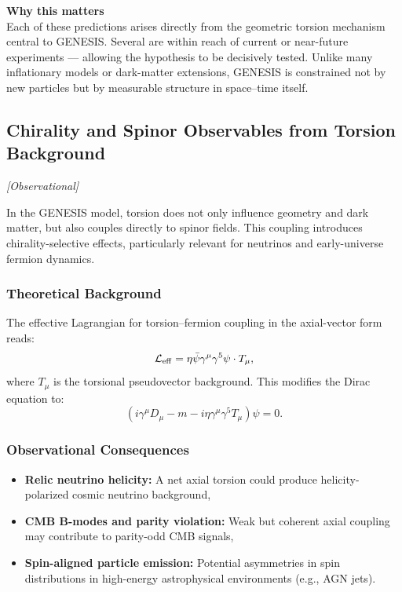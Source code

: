 \documentclass{article}
\newcommand{\obstag}{\textcolor{green!60!black}{\textit{[Observational]}}}
\begin{document}
\begin{tcolorbox}[
  colback=white,
  colframe=black!30,
  boxrule=0.3pt,
  arc=2pt,
  left=6pt,
  right=6pt,
  top=4pt,
  bottom=4pt,
  enhanced
]
\textbf{Why this matters} \\
\vspace{2pt}
Each of these predictions arises directly from the geometric torsion mechanism central to GENESIS.
Several are within reach of current or near-future experiments — allowing the hypothesis to be
decisively tested. Unlike many inflationary models or dark-matter extensions, GENESIS is
constrained not by new particles but by measurable structure in space–time itself.
\end{tcolorbox}




\subsection{ Chirality and Spinor Observables from Torsion Background}
\label{sec:spinor_observables}
\obstag


In the GENESIS model, torsion does not only influence geometry and dark matter, but also couples directly to spinor fields. This coupling introduces chirality-selective effects, particularly relevant for neutrinos and early-universe fermion dynamics.

\subsubsection*{Theoretical Background}
The effective Lagrangian for torsion–fermion coupling in the axial-vector form reads:
\begin{equation}
\mathcal{L}_{\rm eff} = \eta \bar{\psi} \gamma^\mu \gamma^5 \psi \cdot T_\mu,
\end{equation}
where $T_\mu$ is the torsional pseudovector background. This modifies the Dirac equation to:
\begin{equation}
\left(i \gamma^\mu D_\mu - m - i \eta \gamma^\mu \gamma^5 T_\mu \right) \psi = 0.
\end{equation}

\subsubsection*{Observational Consequences}
\begin{itemize}
  \item \textbf{Relic neutrino helicity:} A net axial torsion could produce helicity-polarized cosmic neutrino background,
  \item \textbf{CMB B-modes and parity violation:} Weak but coherent axial coupling may contribute to parity-odd CMB signals,
  \item \textbf{Spin-aligned particle emission:} Potential asymmetries in spin distributions in high-energy astrophysical environments (e.g., AGN jets).
\end{itemize}
\end{document}
